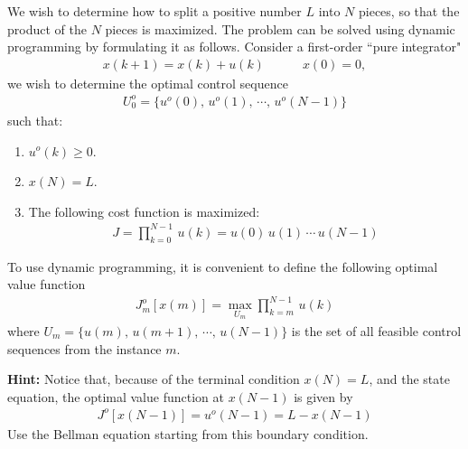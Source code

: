 \item
We wish to determine how to split a positive number $L$ into $N$ pieces, so that the product of the $N$ pieces is maximized. The problem can be solved using dynamic programming by formulating it as follows. Consider a first-order ``pure integrator"
\begin{align*}
    x(k+1) = x(k) + u(k)\hspace{3em} x(0) = 0,
\end{align*}
we wish to determine the optimal control sequence
\begin{align*}
    U_0^o = \{ u^o(0),\,u^o(1),\,\cdots,\, u^o(N-1)\}
\end{align*}
such that:

\begin{enumerate}
    \item
    $u^o(k) \ge 0$.

    \item
    $x(N) = L$.

    \item
    The following cost function is maximized:
    \begin{align*}
        J  = \prod_{k=0}^{N-1}\, u (k) = u (0) \,u (1) \,\cdots \, u(N-1)
    \end{align*}
\end{enumerate}

To use dynamic programming, it is convenient to define the following optimal value function
\begin{align*}
    J_m^o[x(m)]  = \max_{U_m} \prod_{k=m}^{N-1}\, u(k)
\end{align*}
where $U_m  = \{ u(m),\,u(m+1),\,\cdots,\, u(N-1)\}$ is the set of all  feasible control sequences from the instance $m$.

\textbf{Hint:} Notice that, because of the terminal condition $x(N) = L$, and the state equation, the optimal value function at $x(N-1)$ is given by
\begin{align*}
    J^o[x(N-1)] = u^o(N-1) = L - x(N-1)
\end{align*}
Use the Bellman equation starting from this boundary condition.
